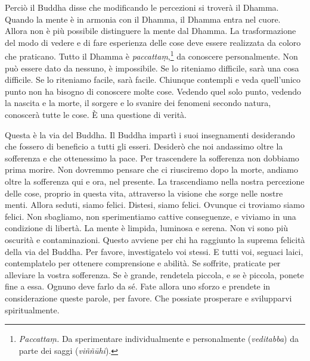 Perciò il Buddha disse che modificando le percezioni si troverà il
Dhamma. Quando la mente è in armonia con il Dhamma, il Dhamma entra nel
cuore. Allora non è più possibile distinguere la mente dal Dhamma. La
trasformazione del modo di vedere e di fare esperienza delle cose deve
essere realizzata da coloro che praticano. Tutto il Dhamma è
\emph{paccattaṃ},\footnote{\emph{Paccattaṃ.} Da sperimentare
  individualmente e personalmente (\emph{veditabba}) da parte dei saggi
  (\emph{viññūhi}).} da conoscere personalmente. Non può essere dato da
nessuno, è impossibile. Se lo riteniamo difficile, sarà una cosa
difficile. Se lo riteniamo facile, sarà facile. Chiunque contempli e
veda quell'unico punto non ha bisogno di conoscere molte cose. Vedendo
quel solo punto, vedendo la nascita e la morte, il sorgere e lo svanire
dei fenomeni secondo natura, conoscerà tutte le cose. È una questione di
verità.

Questa è la via del Buddha. Il Buddha impartì i suoi insegnamenti
desiderando che fossero di beneficio a tutti gli esseri. Desiderò che
noi andassimo oltre la sofferenza e che ottenessimo la pace. Per
trascendere la sofferenza non dobbiamo prima morire. Non dovremmo
pensare che ci riusciremo dopo la morte, andiamo oltre la sofferenza qui
e ora, nel presente. La trascendiamo nella nostra percezione delle cose,
proprio in questa vita, attraverso la visione che sorge nelle nostre
menti. Allora seduti, siamo felici. Distesi, siamo felici. Ovunque ci
troviamo siamo felici. Non sbagliamo, non sperimentiamo cattive
conseguenze, e viviamo in una condizione di libertà. La mente è limpida,
luminosa e serena. Non vi sono più oscurità e contaminazioni. Questo
avviene per chi ha raggiunto la suprema felicità della via del Buddha.
Per favore, investigatelo voi stessi. E tutti voi, seguaci laici,
contemplatelo per ottenere comprensione e abilità. Se soffrite,
praticate per alleviare la vostra sofferenza. Se è grande, rendetela
piccola, e se è piccola, ponete fine a essa. Ognuno deve farlo da sé.
Fate allora uno sforzo e prendete in considerazione queste parole, per
favore. Che possiate prosperare e svilupparvi spiritualmente.

